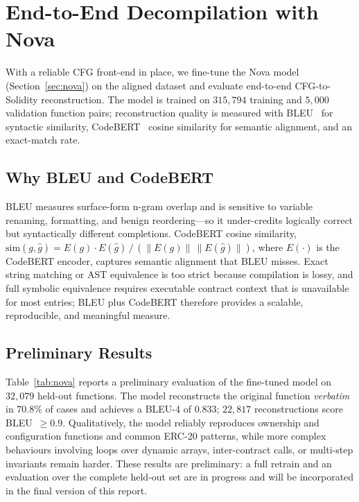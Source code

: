 \documentclass{stylefiles/capstone}
\begin{document}
\section{End-to-End Decompilation with Nova}
\label{sec:nova-eval}

With a reliable CFG front-end in place, we fine-tune the Nova model
(Section~\ref{sec:nova}) on the aligned dataset and evaluate end-to-end
CFG-to-Solidity reconstruction. The model is trained on $315{,}794$ training and
$5{,}000$ validation function pairs; reconstruction quality is measured with
BLEU~\cite{papineni2002bleu} for syntactic similarity, CodeBERT~\cite{feng2020codebert}
cosine similarity for semantic alignment, and an exact-match rate.

\subsection{Why BLEU and CodeBERT}
BLEU measures surface-form n-gram overlap and is sensitive to variable renaming,
formatting, and benign reordering—so it under-credits logically correct but
syntactically different completions. CodeBERT cosine similarity,
$\text{sim}(g,\hat{g}) = E(g)\!\cdot\! E(\hat{g}) \,/\, (\lVert E(g)\rVert\,\lVert E(\hat{g})\rVert)$,
where $E(\cdot)$ is the CodeBERT encoder, captures semantic alignment that BLEU
misses. Exact string matching or AST equivalence is too strict because compilation
is lossy, and full symbolic equivalence requires executable contract context that
is unavailable for most entries; BLEU plus CodeBERT therefore provides a scalable,
reproducible, and meaningful measure.

\subsection{Preliminary Results}
Table~\ref{tab:nova} reports a preliminary evaluation of the fine-tuned model on
$32{,}079$ held-out functions. The model reconstructs the original function
\emph{verbatim} in $70.8\%$ of cases and achieves a BLEU-4 of $0.833$; $22{,}817$
reconstructions score BLEU~$\geq 0.9$. Qualitatively, the model reliably reproduces
ownership and configuration functions and common ERC-20 patterns, while more
complex behaviours involving loops over dynamic arrays, inter-contract calls, or
multi-step invariants remain harder. These results are preliminary: a full retrain
and an evaluation over the complete held-out set are in progress and will be
incorporated in the final version of this report.
\end{document}
